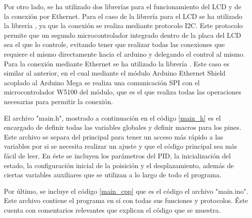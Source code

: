 Por otro lado, se ha utilizado dos librerías para el funcionamiento del LCD y de la conexión por Ethernet. Para el caso
de la librería para el LCD se ha utilizado la librería \cite{lcd}, ya que la conexión se realiza mediante protocolo I2C.
Este protocolo permite que un segundo microcontrolador integrado dentro de la placa del LCD sea el que lo controle, evitando
tener que realizar todas las conexiones que requiere el mismo directamente hacia el arduino y delegando el control al mismo.
Para la conexión mediante Ethernet se ha utilizado la librería \cite{ethernet}. Este caso es similar al anterior, en el cual
mediante el módulo Arduino Ethernet Shield acoplado al Arduino Mega se realiza una comunicación SPI con el microcontrolador 
W5100 del módulo, que es el que realiza todas las operaciones necesarias para permitir la conexión.

El archivo "main.h", mostrado a continuación en el código \ref{main_h} es el encargado de definir todas las variables globales
y definir macros para los pines. Este archivo se separa del principal para tener un acceso más rápido a las variables por si 
se necesita realizar un ajuste y que el código principal sea más fácil de leer. En éste se incluyen los parámetros del PID,
la inicialización del estado, la configuración inicial de la poisición y el desplazamiento, además de ciertas variables auxiliares
que se utilizan a lo largo de todo el programa.



Por último, se incluye el código \ref{main_cpp} que es el código el archivo "main.ino". Este archivo contiene el programa en sí
con todas sus funciones y protocolos. Éste cuenta con comentarios relevantes que explican el código que se muestra.

